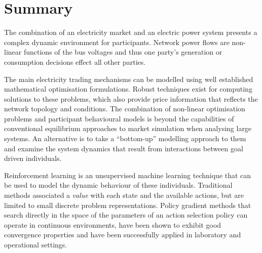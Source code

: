 \section{Summary}
The combination of an electricity market and an electric power system presents
a complex dynamic environment for participants.  Network power flows are
non-linear functions of the bus voltages and thus one party's generation or
consumption decisions effect all other parties.

The main electricity trading mechanisms can be modelled using well established
mathematical optimisation formulations.  Robust techniques exist for computing
solutions to these problems, which also provide price information that reflects
the network topology and conditions.
The combination of non-linear optimisation problems and participant behavioural
models is beyond the capabilities of conventional equilibrium approaches to
market simulation when analysing large systems.  An alternative is to take a
``bottom-up'' modelling approach to them and examine the system dynamics that
result from interactions between goal driven individuals.

Reinforcement learning is an unsupervised machine learning technique that can be
used to model the dynamic behaviour of these individuals.  Traditional methods
associated a \textit{value} with each state and the available actions, but are
limited to small discrete problem representations.  Policy gradient methods that
search directly in the space of the parameters of an action selection policy can
operate in continuous environments, have been shown to exhibit good convergence
properties and have been successfully applied in laboratory and operational
settings.
